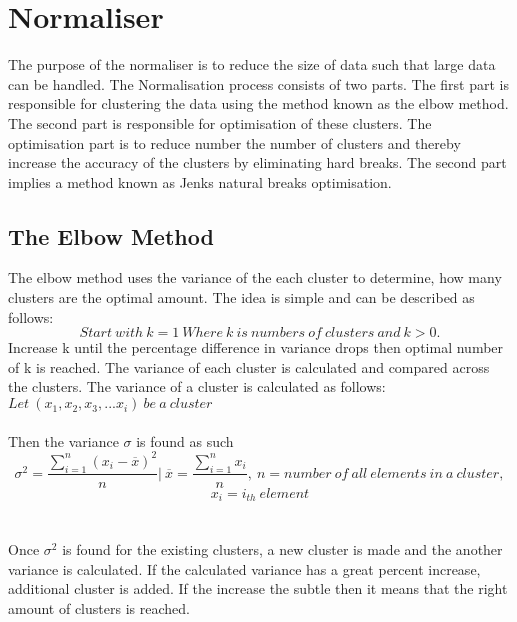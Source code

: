 \section{Normaliser}
\label{sec:normaliser}
The purpose of the normaliser is to reduce the size of data such that large data can be handled. The Normalisation process consists of two parts. The first part is responsible for clustering the data using the method known as the elbow method. The second part is responsible for optimisation of these clusters. The optimisation part is to reduce number the number of clusters and thereby increase the accuracy of the clusters by eliminating hard breaks. The second part implies a method known as Jenks natural breaks optimisation.

\subsection{The Elbow Method}
\label{sub:elbow_method}
The elbow method uses the variance of the each cluster to determine, how many clusters are the optimal amount. The idea is simple and can be described as follows:
 $$Start\ with\ k = 1\ Where \ k \ is \ numbers \ of \ clusters \ and \ k>0.$$ 
Increase k until the percentage difference in variance drops then
optimal number of k is reached.
The variance of each cluster is calculated and compared across the clusters. The variance of a cluster is calculated as follows:
$Let\ (x_1,x_2,x_3,...x_i) \ be \ a\ cluster $
\\\\Then the variance $\sigma$ is found as such
$$\sigma^2 = \frac{\displaystyle\sum_{i = 1}^{n}(x_{i}-\overline{x})^2 }{n} \Biggr\rvert\ \overline{x}  =\frac{\displaystyle\sum_{i=1}^{n}x_{i}}{n},\ n =number\ of\ all\ elements\ in\ a\ cluster ,$$ 
$$ x_{i} = i_{th}\ element $$
\\\\
Once $\sigma^2$ is found for the existing clusters, a new cluster is made and the another variance is calculated. If the calculated variance has a great percent increase, additional cluster is added. If the increase the subtle then it means that the right amount of clusters is reached.
